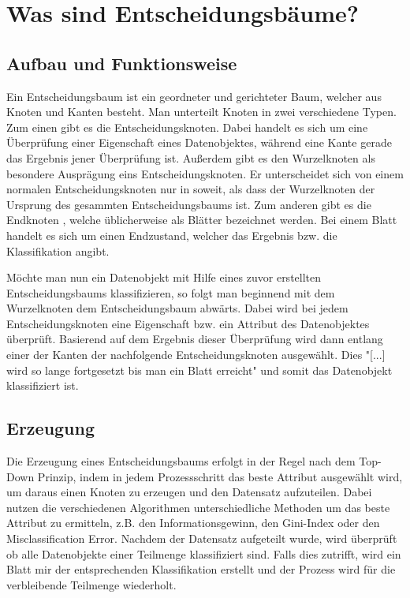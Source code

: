 \chapter{Was sind Entscheidungsbäume?}
\label{eb:was-sind-entscheidungsbaeume}

\section{Aufbau und Funktionsweise}
\label{eb:aufbau}
Ein Entscheidungsbaum ist ein geordneter und gerichteter \autocite{DataMining} Baum, welcher aus Knoten und Kanten besteht. Man unterteilt Knoten in zwei verschiedene Typen. Zum einen gibt es die Entscheidungsknoten. \autocite{FramworkForSensitivity:online} Dabei handelt es sich um eine Überprüfung einer Eigenschaft eines Datenobjektes, während eine Kante gerade das Ergebnis jener Überprüfung ist. \autocite{DataMining} Außerdem gibt es den Wurzelknoten als besondere Ausprägung eins Entscheidungsknoten. Er unterscheidet sich von einem normalen Entscheidungsknoten nur in soweit, als dass der Wurzelknoten der Ursprung des gesammten Entscheidungsbaums ist. Zum anderen gibt es die Endknoten \autocite{FramworkForSensitivity:online}, welche üblicherweise als Blätter bezeichnet werden. Bei einem Blatt handelt es sich um einen Endzustand, welcher das Ergebnis bzw. die Klassifikation angibt. \autocite{DataMining}

Möchte man nun ein Datenobjekt mit Hilfe eines zuvor erstellten Entscheidungsbaums klassifizieren, so folgt man beginnend mit dem Wurzelknoten dem Entscheidungsbaum abwärts. Dabei wird bei jedem Entscheidungsknoten eine Eigenschaft bzw. ein Attribut des Datenobjektes überprüft. Basierend auf dem Ergebnis dieser Überprüfung wird dann entlang einer der Kanten der nachfolgende Entscheidungsknoten ausgewählt. \autocite{DataMining} Dies "[...] wird so lange fortgesetzt bis man ein Blatt erreicht" \autocite{Entschei47:online} und somit das Datenobjekt klassifiziert ist.

\section{Erzeugung}
\label{eb:erstellung}
Die Erzeugung eines Entscheidungsbaums erfolgt in der Regel nach dem Top-Down Prinzip, indem in jedem Prozessschritt das beste Attribut ausgewählt wird, um daraus einen Knoten zu erzeugen und den Datensatz aufzuteilen. \autocite{TopDownInduction} Dabei nutzen die verschiedenen Algorithmen unterschiedliche Methoden um das beste Attribut zu ermitteln, z.B. den Informationsgewinn, den Gini-Index oder den Misclassification Error. \autocite{DataMining} Nachdem der Datensatz aufgeteilt wurde, wird überprüft ob alle Datenobjekte einer Teilmenge klassifiziert sind. Falls dies zutrifft, wird ein Blatt mir der entsprechenden Klassifikation erstellt und der Prozess wird für die verbleibende Teilmenge wiederholt. \autocite{SebastianManteyPruning:online}

